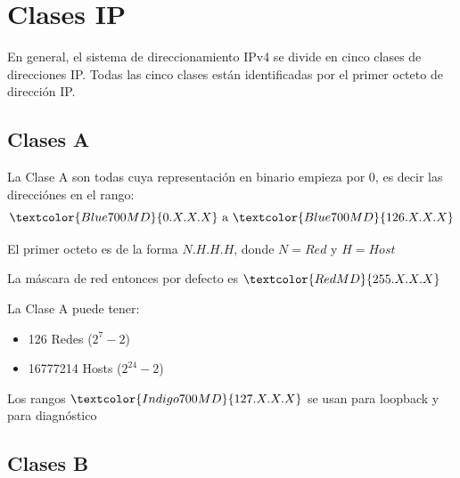 \documentclass[12pt, fleqn]{report}                             %
\theoremstyle{break}                                            %
\newcommand{\Color}[2]{\textcolor{#1}{#2}}                      %
\begin{document}
        \clearpage
        \section{Clases IP}

            En general, el sistema de direccionamiento IPv4 se divide en cinco clases de direcciones IP.
            Todas las cinco clases están identificadas por el primer octeto de dirección IP.

            \subsection{Clases A}

                La Clase A son todas cuya representación en binario empieza por $0$, es decir las
                direcciónes en el rango:
                \begin{equation*}
                    \Color{Blue700MD}{0.X.X.X}
                    \text{ a }
                    \Color{Blue700MD}{126.X.X.X}
                \end{equation*}

                El primer octeto es de la forma $N.H.H.H$, donde $N = Red$ y $H = Host$

                La máscara de red entonces por defecto es $\Color{RedMD}{255.X.X.X}$

                La Clase A puede tener:
                \begin{itemize}
                    \item 126 Redes ($2^7 - 2$)
                    \item 16777214 Hosts ($2^{24} - 2$)
                \end{itemize}

                Los rangos $\Color{Indigo700MD}{127.X.X.X}$ se usan para loopback y para diagnóstico


            \subsection{Clases B}
\end{document}
